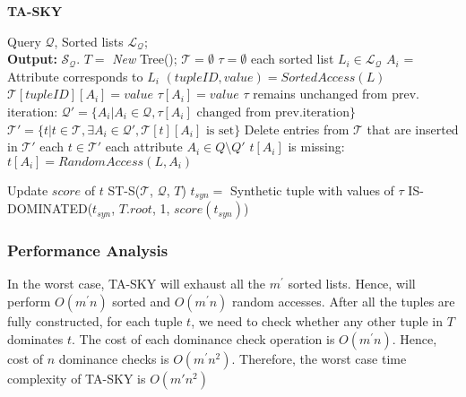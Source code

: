 \begin{algorithm}[!htb]
\caption{{\bf TA-SKY}}
\begin{algorithmic}[1]
\label{alg:taSky}
 Query $\mathcal{Q}$, Sorted lists $\mathcal{L_Q}$; \\ {\bf Output:} $\mathcal{S}_\mathcal{Q}$.
\STATE $T = $ {\it New} Tree(); $\mathcal{T} = \emptyset$
    \STATE \hindent $\tau = \emptyset$
    \STATE {} each sorted list $L_i \in \mathcal{L_Q}$
        \STATE \hindent[2] $A_i$ = Attribute corresponds to $L_i$
        \STATE \hindent[2] $(tupleID, value) = SortedAccess(L)$
        \STATE \hindent[2] $\mathcal{T}[tupleID][A_i] = value$
        \STATE \hindent[2] $\tau[A_i] = value$
    \STATE {} $\tau$ remains unchanged from prev. iteration:
        \STATE {}
    \STATE \hindent $\mathcal{Q'} = \{A_i | A_i \in \mathcal{Q}, \tau[A_i] \text{ changed from prev.iteration}\}$
    \STATE \hindent $\mathcal{T'} = \{t | t \in \mathcal{T}, \exists A_i \in \mathcal{Q'}, \mathcal{T}[t][A_i] \text{ is set} \}$
    \STATE \hindent Delete entries from $\mathcal{T}$ that are inserted in $\mathcal{T'}$
    \STATE {} each $t \in \mathcal{T'}$
        \STATE {} each attribute $A_i \in Q \setminus Q'$
            \STATE {} $t[A_i]$ is missing:
                \STATE \hindent[4] $t[A_i]= RandomAccess(L, A_i)$
        
        \STATE \hindent[2] Update $score$ of $t$
    \STATE \hindent ST-S($\mathcal{T}$, $\mathcal{Q}$, $T$)
    \STATE \hindent $t_{syn}=$ Synthetic tuple with values of $\tau$
 IS-DOMINATED($t_{syn}$, $T.root$, 1, $score(t_{syn})$)
\end{algorithmic}
\end{algorithm}

\subsubsection{Performance Analysis}\label{sec:TASKY-performance}

\vspace{1mm}
 In the worst case, TA-SKY will exhaust all the $m^\prime$ sorted lists. Hence, will perform $O(m^\prime n)$ sorted and $O(m^\prime n)$ random accesses. After all the tuples are fully constructed, for each tuple $t$, we need to check whether any other tuple in $T$ dominates $t$. The cost of each dominance check operation is $O(m^\prime n)$. Hence, cost of $n$ dominance checks is $O(m^\prime n^2)$. Therefore, the worst case time complexity of TA-SKY is $O(m'n^2)$

